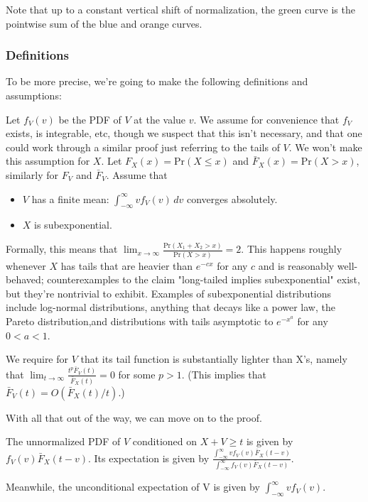 \documentclass[../neurips_2024.tex]{subfiles}
\begin{document}
Note that up to a constant vertical shift of normalization, the green curve is the pointwise sum of the blue and orange curves.

\subsubsection{Definitions}

To be more precise, we're going to make the following definitions and assumptions:

Let \(f_V(v)\) be the PDF of \(V\) at the value \(v\). We assume for convenience that \(f_V\) exists, is integrable, etc, though we suspect that this isn't necessary, and that one could work through a similar proof just referring to the tails of \(V\). We won't make this assumption for \(X\).
Let \(F_X(x)=\text{Pr}(X\le x)\) and \(\bar{F}_X(x)=\text{Pr}(X>x)\), similarly for \(F_V\) and \(\bar{F}_V\). 
Assume that
\begin{itemize}
    \item \(V\) has a finite mean: \(\int_{-\infty}^\infty vf_V(v)\,dv\) converges absolutely.
    \item \(X\) is subexponential.
\end{itemize}

Formally, this means that \(\lim_{x\to\infty}\frac{\text{Pr}(X_1+X_2>x)}{\text{Pr}(X>x)} = 2\). 
This happens roughly whenever \(X\) has tails that are heavier than \(e^{-cx}\) for any \(c\) and is reasonably well-behaved; counterexamples to the claim "long-tailed implies subexponential" exist, but they're nontrivial to exhibit.
Examples of subexponential distributions include log-normal distributions, anything that decays like a power law, the Pareto distribution,and distributions with tails asymptotic to \(e^{-x^a}\) for any \(0<a<1\).

We require for \(V\) that its tail function is substantially lighter than X's, namely that \(\lim_{t\to\infty}\frac{t^p\bar F_V(t)}{\bar F_X(t)} = 0\) for some \(p > 1\). (This implies that \(\bar F_V(t) = O(\bar F_X(t) / t)\).)

With all that out of the way, we can move on to the proof. 

The unnormalized PDF of \(V\) conditioned on \(X+V\ge t\) is given by \(f_V(v)\bar{F}_X(t-v)\). Its expectation is given by \(\frac{\int_{-\infty}^\infty vf_V(v)\bar{F}_X(t-v)} {\int_{-\infty}^\infty f_V(v)\bar{F}_X(t-v)}\).

Meanwhile, the unconditional expectation of V is given by \(\int_{-\infty}^\infty vf_V(v)\).
\end{document}
